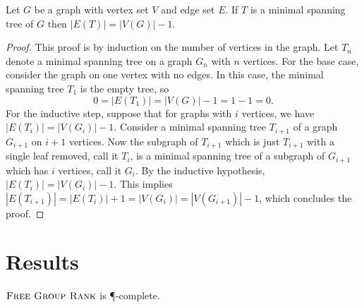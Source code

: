 \documentclass{article}
\newcommand{\FGR}{\textsc{Free Group Rank}}
\begin{document}
\begin{lemma}\label{lem:tree}
  Let $G$ be a graph with vertex set $V$ and edge set $E$.
  If $T$ is a minimal spanning tree of $G$ then $|E(T)| = |V(G)| - 1$.
\end{lemma}
\begin{proof}
  This proof is by induction on the number of vertices in the graph.
  Let $T_n$ denote a minimal spanning tree on a graph $G_n$ with $n$ vertices.
  For the base case, consider the graph on one vertex with no edges.
  In this case, the minimal spanning tree $T_1$ is the empty tree, so
  \begin{equation*}
    0 = |E(T_1)| = |V(G)| - 1 = 1 - 1 = 0.
  \end{equation*}
  For the inductive step, suppose that for graphs with $i$ vertices, we have $|E(T_i)| = |V(G_i)| - 1$.
  Consider a minimal spanning tree $T_{i + 1}$ of a graph $G_{i + 1}$ on $i + 1$ vertices.
  Now the subgraph of $T_{i + 1}$ which is just $T_{i + 1}$ with a single leaf removed, call it $T_i$, is a minimal spanning tree of a subgraph of $G_{i + 1}$ which has $i$ vertices, call it $G_i$.
  By the inductive hypothesis, $|E(T_i)| = |V(G_i)| - 1$.
  This implies $|E(T_{i + 1})| = |E(T_i)| + 1 = |V(G_i)| = |V(G_{i + 1})| - 1$, which concludes the proof.
\end{proof}

\section{Results}

\begin{theorem}
  $\FGR$ is \P-complete.
\end{theorem}
\end{document}
